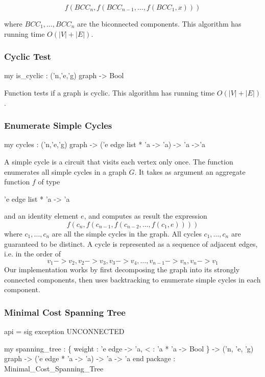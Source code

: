 \[
   f(BCC_n,f(BCC_{n-1},\ldots, f(BCC_1,x))) 
\]

where $BCC_1,\ldots,BCC_n$ are the biconnected components.
This algorithm has running time $O(|V|+|E|)$.

\subsubsection{Cyclic Test}
\begin{SML}
 my is_cyclic : ('n,'e,'g) graph -> Bool
\end{SML}
Function  tests if a graph is cyclic.
This algorithm has running time $O(|V|+|E|)$.

\subsubsection{Enumerate Simple Cycles}
\begin{SML}
 my cycles : ('n,'e,'g) graph -> ('e edge list * 'a -> 'a) -> 'a ->'a
\end{SML}
  A simple cycle is a circuit that visits each vertex only once.
  The function  enumerates all simple cycles in a graph $G$.
  It takes as argument an aggregate function $f$ of type 
  \begin{SML}
       'e edge list * 'a -> 'a
  \end{SML}
  and an identity element $e$, and computes as result the expression
  \[
     f(c_n,f(c_{n-1},f(c_{n-2},\ldots, f(c_1,e)))) 
  \]
  where $c_1,\ldots,c_n$ are all the simple cycles in the graph.   
  All cycles $c_1,\ldots,c_n$ are guaranteed to be distinct.  
  A cycle is represented as a sequence of
  adjacent edges, i.e. in the order of 
  \[ 
     v_1 -> v_2, v_2 -> v_3, v_3 -> v_4, \ldots, v_{n-1} -> v_n, v_n -> v_1 
  \]
  Our implementation works by first decomposing the graph into
  its strongly connected components, then uses backtracking to enumerate
  simple cycles in each component.
\subsubsection{Minimal Cost Spanning Tree}
\begin{SML}
 api  = sig
   exception UNCONNECTED

   my spanning_tree : \{ weight    : 'e edge -> 'a,
                         <         : 'a * 'a -> Bool
                       \} -> ('n, 'e, 'g) graph
                         -> ('e edge * 'a -> 'a) -> 'a -> 'a
 end
 package  : Minimal_Cost_Spanning_Tree
\end{SML}

